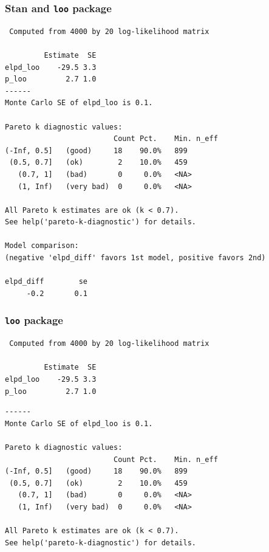 \documentclass[10pt]{beamer}
\begin{document}
\begin{frame}[fragile]

\frametitle{Stan and {\tt loo} package}

  {\scriptsize
\begin{lstlisting}
 Computed from 4000 by 20 log-likelihood matrix

         Estimate  SE
elpd_loo    -29.5 3.3
p_loo         2.7 1.0
------
Monte Carlo SE of elpd_loo is 0.1.

Pareto k diagnostic values:
                         Count Pct.    Min. n_eff
(-Inf, 0.5]   (good)     18    90.0%   899
 (0.5, 0.7]   (ok)        2    10.0%   459
   (0.7, 1]   (bad)       0     0.0%   <NA>
   (1, Inf)   (very bad)  0     0.0%   <NA>

All Pareto k estimates are ok (k < 0.7).
See help('pareto-k-diagnostic') for details.

Model comparison:
(negative 'elpd_diff' favors 1st model, positive favors 2nd)

elpd_diff        se
     -0.2       0.1
\end{lstlisting}
}

\end{frame}


\begin{frame}[fragile]
\frametitle{{\tt loo} package}

  {\scriptsize
\begin{lstlisting}
 Computed from 4000 by 20 log-likelihood matrix

         Estimate  SE
elpd_loo    -29.5 3.3
p_loo         2.7 1.0
\end{lstlisting}
      {\color{gray}
\begin{lstlisting}
------
Monte Carlo SE of elpd_loo is 0.1.

Pareto k diagnostic values:
                         Count Pct.    Min. n_eff
(-Inf, 0.5]   (good)     18    90.0%   899
 (0.5, 0.7]   (ok)        2    10.0%   459
   (0.7, 1]   (bad)       0     0.0%   <NA>
   (1, Inf)   (very bad)  0     0.0%   <NA>

All Pareto k estimates are ok (k < 0.7).
See help('pareto-k-diagnostic') for details.
\end{lstlisting}}
}
\end{frame}
\end{document}
